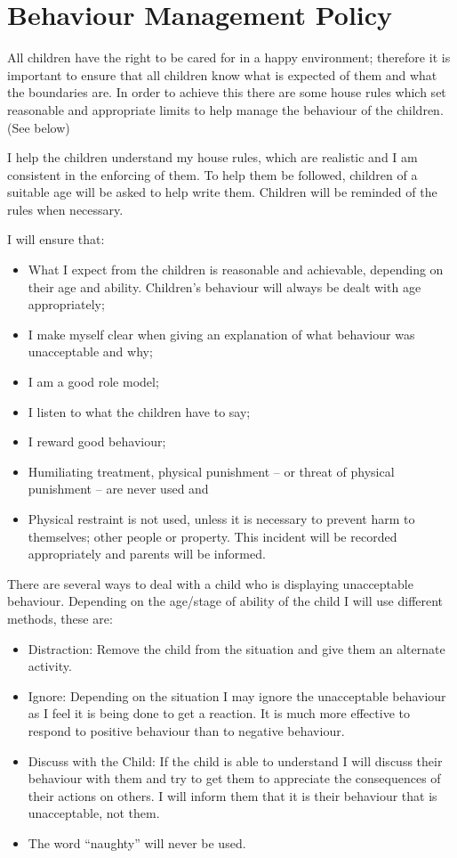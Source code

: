 

\section{Behaviour Management Policy}

All children have the right to be cared for in a happy environment;
therefore it is important to ensure that all children know what is
expected of them and what the boundaries are. In order to achieve this
there are some house rules which set reasonable and appropriate limits
to help manage the behaviour of the children. (See below)

I help the children understand my house rules, which are realistic and I
am consistent in the enforcing of them. To help them be followed,
children of a suitable age will be asked to help write them. Children
will be reminded of the rules when necessary.

I will ensure that:

\begin{itemize}
\item
  What I expect from the children is reasonable and achievable,
  depending on their age and ability. Children's behaviour will always
  be dealt with age appropriately; ~
\item
  I make myself clear when giving an explanation of what behaviour was
  unacceptable and why;~
\item
  I am a good role model;~
\item
  I listen to what the children have to say; ~
\item
  I reward good behaviour;~
\item
  Humiliating treatment, physical punishment -- or threat of physical
  punishment -- are never used and~
\item
  Physical restraint is not used, unless it is necessary to prevent
  harm to themselves; other people or property. This incident will be
  recorded appropriately and parents will be informed. ~
\end{itemize}

There are several ways to deal with a child who is displaying
unacceptable behaviour. Depending on the age/stage of ability of the
child I will use different methods, these are:

\begin{itemize}
\item
  Distraction: Remove the child from the situation and give them an
  alternate activity. ~
\item
  Ignore: Depending on the situation I may ignore the unacceptable
  behaviour as I feel it is being done to get a reaction. It is much
  more effective to respond to positive behaviour than to negative
  behaviour. ~
\item
  Discuss with the Child: If the child is able to understand I will
  discuss their behaviour with them and try to get them to appreciate
  the consequences of their actions on others. I will inform them that
  it is their behaviour that is unacceptable, not them.~
\item
  The word ``naughty'' will never be used.~
\end{itemize}

